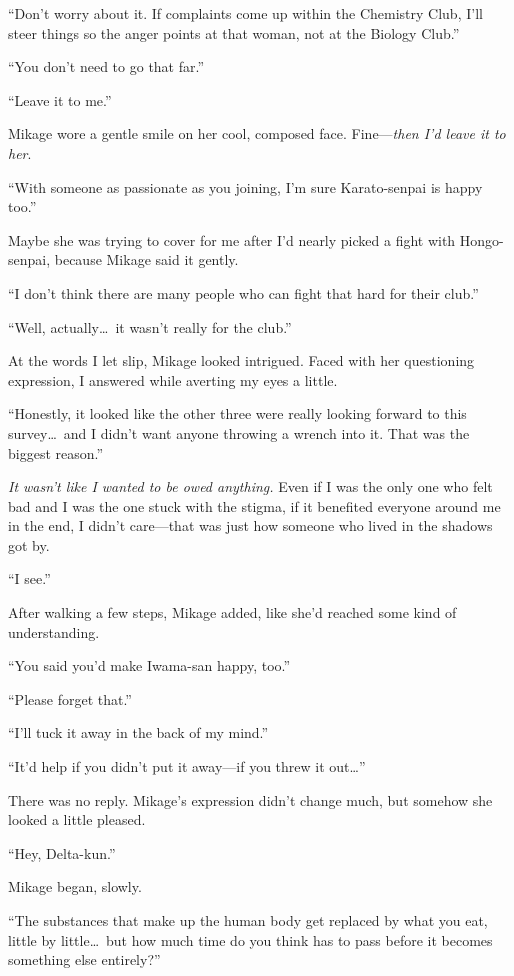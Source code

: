 \documentclass[
    a4paper,
    12pt,
    twoside,
    openany,
    UTF8,
    fontset=windows
]{ctexbook}
\begin{document}
``Don't worry about it. If complaints come up within the Chemistry Club, I'll steer things so the anger points at that woman, not at the Biology Club.''

``You don't need to go that far.''

``Leave it to me.''

Mikage wore a gentle smile on her cool, composed face. Fine---\textit{then I'd leave it to her}.

``With someone as passionate as you joining, I'm sure Karato-senpai is happy too.''

Maybe she was trying to cover for me after I'd nearly picked a fight with Hongo-senpai, because Mikage said it gently.

``I don't think there are many people who can fight that hard for their club.''

``Well, actually\dots\ it wasn't really for the club.''

At the words I let slip, Mikage looked intrigued. Faced with her questioning expression, I answered while averting my eyes a little.

``Honestly, it looked like the other three were really looking forward to this survey\dots\ and I didn't want anyone throwing a wrench into it. That was the biggest reason.''

\textit{It wasn't like I wanted to be owed anything.} Even if I was the only one who felt bad and I was the one stuck with the stigma, if it benefited everyone around me in the end, I didn't care---that was just how someone who lived in the shadows got by.

``I see.''

After walking a few steps, Mikage added, like she'd reached some kind of understanding.

``You said you'd make Iwama-san happy, too.''

``Please forget that.''

``I'll tuck it away in the back of my mind.''

``It'd help if you didn't put it away---if you threw it out\dots''

There was no reply. Mikage's expression didn't change much, but somehow she looked a little pleased.

``Hey, Delta-kun.''

Mikage began, slowly.

``The substances that make up the human body get replaced by what you eat, little by little\dots\ but how much time do you think has to pass before it becomes something else entirely?''
\end{document}
